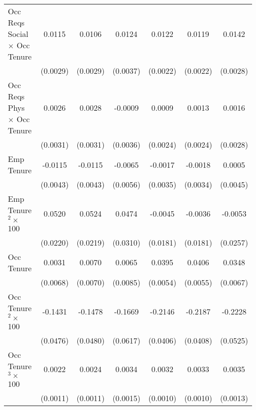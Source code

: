 {\begin{longtable}{l*{6}{c}}
Occ Reqs Social $\times$ Occ Tenure&      0.0115\sym{***}&      0.0106\sym{***}&      0.0124\sym{***}&      0.0122\sym{***}&      0.0119\sym{***}&      0.0142\sym{***}\\
                    &    (0.0029)         &    (0.0029)         &    (0.0037)         &    (0.0022)         &    (0.0022)         &    (0.0028)         \\
Occ Reqs Phys $\times$ Occ Tenure&      0.0026         &      0.0028         &     -0.0009         &      0.0009         &      0.0013         &      0.0016         \\
                    &    (0.0031)         &    (0.0031)         &    (0.0036)         &    (0.0024)         &    (0.0024)         &    (0.0028)         \\
Emp Tenure          &     -0.0115\sym{***}&     -0.0115\sym{***}&     -0.0065         &     -0.0017         &     -0.0018         &      0.0005         \\
                    &    (0.0043)         &    (0.0043)         &    (0.0056)         &    (0.0035)         &    (0.0034)         &    (0.0045)         \\
Emp Tenure$^2\times$ 100&      0.0520\sym{**} &      0.0524\sym{**} &      0.0474         &     -0.0045         &     -0.0036         &     -0.0053         \\
                    &    (0.0220)         &    (0.0219)         &    (0.0310)         &    (0.0181)         &    (0.0181)         &    (0.0257)         \\
Occ Tenure          &      0.0031         &      0.0070         &      0.0065         &      0.0395\sym{***}&      0.0406\sym{***}&      0.0348\sym{***}\\
                    &    (0.0068)         &    (0.0070)         &    (0.0085)         &    (0.0054)         &    (0.0055)         &    (0.0067)         \\
Occ Tenure$^2\times$ 100&     -0.1431\sym{***}&     -0.1478\sym{***}&     -0.1669\sym{***}&     -0.2146\sym{***}&     -0.2187\sym{***}&     -0.2228\sym{***}\\
                    &    (0.0476)         &    (0.0480)         &    (0.0617)         &    (0.0406)         &    (0.0408)         &    (0.0525)         \\
Occ Tenure$^3\times$ 100&      0.0022\sym{**} &      0.0024\sym{**} &      0.0034\sym{**} &      0.0032\sym{***}&      0.0033\sym{***}&      0.0035\sym{***}\\
                    &    (0.0011)         &    (0.0011)         &    (0.0015)         &    (0.0010)         &    (0.0010)         &    (0.0013)         \\

\end{longtable}}
